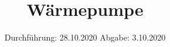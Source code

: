 

\subject{D206}
\title{Wärmepumpe}
\date{%
  Durchführung: 28.10.2020
  \hspace{3em}
  Abgabe: 3.10.2020
}



\maketitle
\newpage






\nocite{*}
\printbibliography{}


